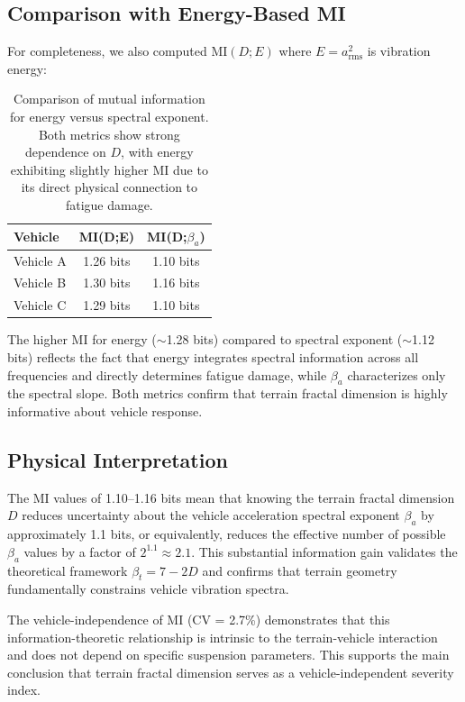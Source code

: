 \documentclass[11pt]{article}
\begin{document}
\subsection{Comparison with Energy-Based MI}

For completeness, we also computed $\text{MI}(D;E)$ where $E = a_{\text{rms}}^2$ is vibration energy:

\begin{table}[h]
\centering
\begin{tabular}{lcc}
\hline
\textbf{Vehicle} & \textbf{MI(D;E)} & \textbf{MI(D;$\beta_a$)} \\
\hline
Vehicle A & 1.26 bits & 1.10 bits \\
Vehicle B & 1.30 bits & 1.16 bits \\
Vehicle C & 1.29 bits & 1.10 bits \\
\hline
\end{tabular}
\caption{Comparison of mutual information for energy versus spectral exponent. Both metrics show strong dependence on $D$, with energy exhibiting slightly higher MI due to its direct physical connection to fatigue damage.}
\end{table}

The higher MI for energy ($\sim$1.28 bits) compared to spectral exponent ($\sim$1.12 bits) reflects the fact that energy integrates spectral information across all frequencies and directly determines fatigue damage, while $\beta_a$ characterizes only the spectral slope. Both metrics confirm that terrain fractal dimension is highly informative about vehicle response.

\subsection{Physical Interpretation}

The MI values of 1.10--1.16 bits mean that knowing the terrain fractal dimension $D$ reduces uncertainty about the vehicle acceleration spectral exponent $\beta_a$ by approximately 1.1 bits, or equivalently, reduces the effective number of possible $\beta_a$ values by a factor of $2^{1.1} \approx 2.1$. This substantial information gain validates the theoretical framework $\beta_t = 7-2D$ and confirms that terrain geometry fundamentally constrains vehicle vibration spectra.

The vehicle-independence of MI (CV = 2.7\%) demonstrates that this information-theoretic relationship is intrinsic to the terrain-vehicle interaction and does not depend on specific suspension parameters. This supports the main conclusion that terrain fractal dimension serves as a vehicle-independent severity index.
\end{document}
